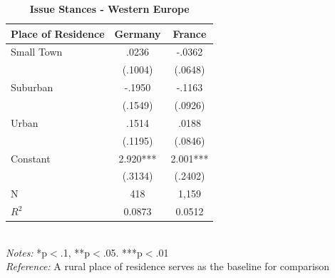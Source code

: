 \documentclass[12pt, titlepage]{article}
\newcommand\e{\emph}
\newcommand\tb{\textbf}
\begin{document}
\begin{singlespace}
	\begin{table}[H]
		\centering
		\caption{\tb{Issue Stances - Western Europe}}
		\begin{tabulary}{\linewidth}{l c c }
		
			\hline
			\tb{Place of Residence}&\tb{Germany}&\tb{France} \\
			\hline
			Small Town& .0236 & -.0362   \\
			&(.1004)  & (.0648)\\
			Suburban&-.1950&-.1163 \\
			&(.1549) &  (.0926) \\
			Urban & .1514&.0188 \\
			&(.1195) &(.0846) \\
			Constant&2.920*** &2.001*** \\
			&(.3134) &(.2402) \\
			N&418& 1,159\\
			$R^2$&0.0873 & 0.0512 \\
			\hline 
\end{tabulary}
\\
\e{Notes:} *p$<$.1, **p$<$.05. ***p$<$.01 \\
\e{Reference:} A rural place of residence serves as the baseline for comparison
\label{WELib}
\end{table}
\end{singlespace}
\end{document}
